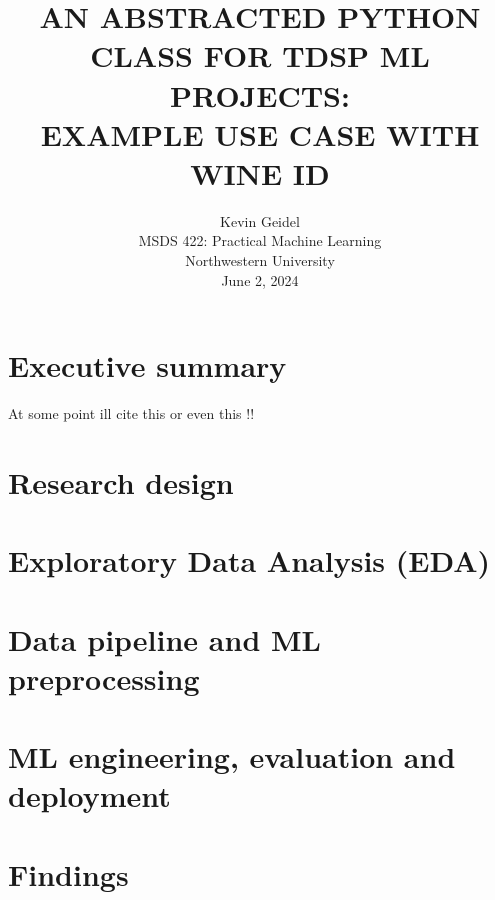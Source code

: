 \documentclass[12pt,letterpaper]{article}
\begin{document}
\selectfont
{}
\doublespacing
\setlength{\droptitle}{1in} 

\title{\large{AN ABSTRACTED PYTHON CLASS FOR TDSP ML PROJECTS: \\ EXAMPLE USE CASE WITH WINE ID \\\vspace{1.2in}}}

\author{
Kevin Geidel \\
MSDS 422: Practical Machine Learning \\
Northwestern University \\
June 2, 2024 \\
}

\date{}
\maketitle
\thispagestyle{empty}	
\clearpage
\setcounter{page}{1}

\section{Executive summary}
\tab At some point ill cite this \citep{tdsp:2024} or even this \citep{Hyatt:2024}!!

\section{Research design}
\tab 

\section{Exploratory Data Analysis (EDA)}
\tab 

\section{Data pipeline and ML preprocessing}
\tab 

\section{ML engineering, evaluation and deployment}
\tab 

\section{Findings}
\tab 
\end{document}
